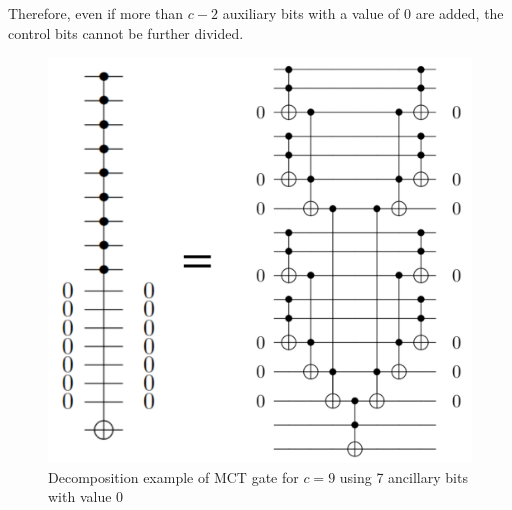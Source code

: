 Therefore, even if more than $c-2$ auxiliary bits with a value of 0 are added,
the control bits cannot be further divided. 
\begin{figure}[tbp]
\centering
\includegraphics[width=0.95\linewidth]{img/niemann_c_2.pdf}
\caption{Decomposition example of MCT gate for $c=9$ using 7 ancillary bits with value 0}
\label{niemann_c_2}
\end{figure}
